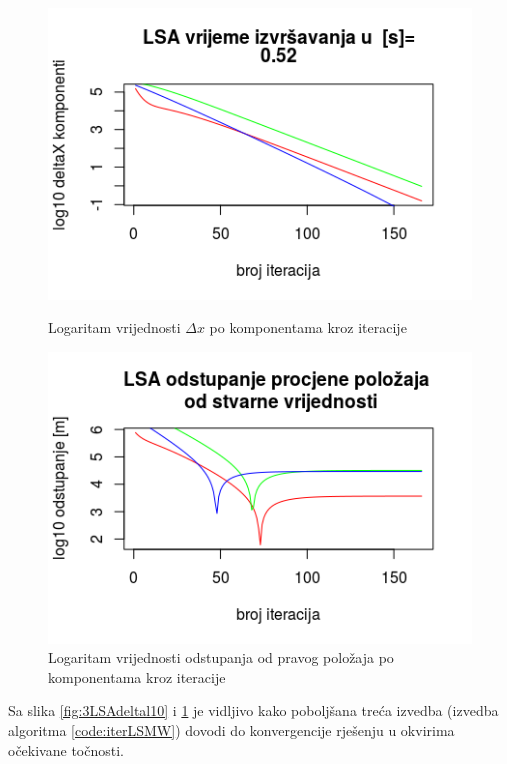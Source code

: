 \documentclass[a4paper,twoside,12pt]{memoir} %
\begin{document}
\begin{figure}[H]
	\begin{minipage}{0.48\textwidth}
		\centering
		\includegraphics[width=1\textwidth]{3LSAdeltal10}
		\caption{Logaritam vrijednosti $\Delta x$ po komponentama kroz iteracije}
		\label{fig:3LSAdeltal10}
	\end{minipage}%
	\hspace{1cm}
	\begin{minipage}{0.48\textwidth}
		
		\includegraphics[width=1\textwidth]{3LSAreall10}
		\caption{Logaritam vrijednosti odstupanja od pravog položaja po komponentama kroz iteracije}
		\label{fig:3LSAreall10}
	\end{minipage}%
\end{figure}

Sa slika \ref{fig:3LSAdeltal10} i \ref{fig:3LSAreall10} je vidljivo kako poboljšana treća izvedba
(izvedba algoritma \ref{code:iterLSMW}) dovodi do konvergencije rješenju u okvirima očekivane točnosti.\\
\end{document}

